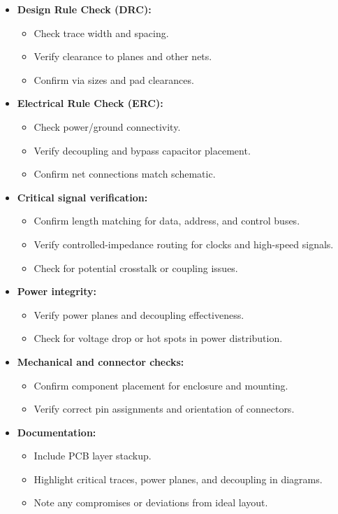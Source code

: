 \documentclass[10pt]{article}
\begin{document}
\begin{itemize}
    \item \textbf{Design Rule Check (DRC):}
        \begin{itemize}
            \item Check trace width and spacing.
            \item Verify clearance to planes and other nets.
            \item Confirm via sizes and pad clearances.
        \end{itemize}

    \item \textbf{Electrical Rule Check (ERC):}
        \begin{itemize}
            \item Check power/ground connectivity.
            \item Verify decoupling and bypass capacitor placement.
            \item Confirm net connections match schematic.
        \end{itemize}

    \item \textbf{Critical signal verification:}
        \begin{itemize}
            \item Confirm length matching for data, address, and control buses.
            \item Verify controlled-impedance routing for clocks and high-speed signals.
            \item Check for potential crosstalk or coupling issues.
        \end{itemize}

    \item \textbf{Power integrity:}
        \begin{itemize}
            \item Verify power planes and decoupling effectiveness.
            \item Check for voltage drop or hot spots in power distribution.
        \end{itemize}

    \item \textbf{Mechanical and connector checks:}
        \begin{itemize}
            \item Confirm component placement for enclosure and mounting.
            \item Verify correct pin assignments and orientation of connectors.
        \end{itemize}

    \item \textbf{Documentation:}
        \begin{itemize}
            \item Include PCB layer stackup.
            \item Highlight critical traces, power planes, and decoupling in diagrams.
            \item Note any compromises or deviations from ideal layout.
        \end{itemize}
\end{itemize}
\end{document}
